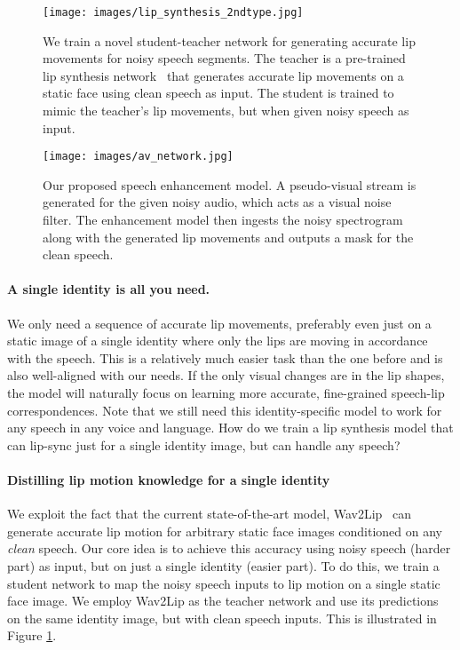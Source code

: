 \documentclass[10pt,twocolumn,letterpaper]{article}
\begin{document}
\begin{figure}[t]
  \texttt{[image: images/lip\_synthesis\_2ndtype.jpg]}
  \caption{We train a novel student-teacher network for generating accurate lip movements for noisy speech segments. The teacher is a pre-trained lip synthesis network~\cite{wav2lip:2020} that generates accurate lip movements on a static face using clean speech as input. The student is trained to mimic the teacher's lip movements, but when given noisy speech as input.}
  \label{fig:lip_synthesis}
\end{figure}


\begin{figure*}[t]
  \texttt{[image: images/av\_network.jpg]}
  \caption{Our proposed speech enhancement model. A pseudo-visual stream is generated for the given noisy audio, which acts as a visual noise filter. The enhancement model then ingests the noisy  spectrogram along with the generated lip movements and outputs a mask for the clean speech.}
  \label{fig:av_network}
\end{figure*}

\vspace{-10pt}
\paragraph{A single identity is all you need.}
We only need a sequence of accurate lip movements, preferably even just on a static image of a single identity where only the lips are moving in accordance with the speech. This is a relatively much easier task than the one before and is also well-aligned with our needs. If the only visual changes are in the lip shapes, the model will naturally focus on learning more accurate, fine-grained speech-lip correspondences. Note that we still need this identity-specific model to work for any speech in any voice and language. How do we train a lip synthesis model that can lip-sync just for a single identity image, but can handle any speech?

\vspace{-10pt}
\paragraph{Distilling lip motion knowledge for a single identity}
We exploit the fact that the current state-of-the-art model, Wav2Lip~\cite{wav2lip:2020} can generate accurate lip motion for arbitrary static face images conditioned on any \textit{clean} speech. Our core idea is to achieve this accuracy using noisy speech (harder part) as input, but on just a single identity (easier part). To do this, we train a student network to map the noisy speech inputs to lip motion on a single static face image. We employ Wav2Lip as the teacher network and use its predictions on the same identity image, but with clean speech inputs. This is illustrated in Figure \ref{fig:lip_synthesis}. 
\end{document}
